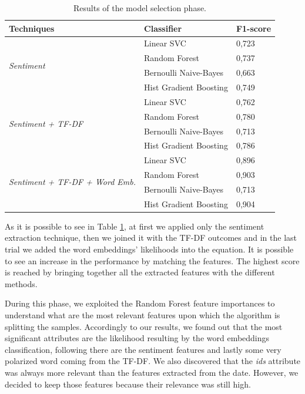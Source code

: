 \documentclass[conference]{IEEEtran}
\begin{document}
\begin{table}[h]
\begin{tabular}{@{}lll@{}}
\toprule
\textbf{Techniques}                                     & \textbf{Classifier}                       & \textbf{F1-score} \\ \midrule
\multirow{4}{*}{\textit{Sentiment}}                     & Linear SVC                       & 0,723    \\
                                               & Random Forest         & 0,737    \\
                                               & Bernoulli Naive-Bayes            & 0,663    \\
                                               & Hist Gradient Boosting & 0,749    \\ \midrule
\multirow{4}{*}{\textit{Sentiment + TF-DF}}             & Linear SVC                       & 0,762    \\
                                               & Random Forest         & 0,780    \\
                                               & Bernoulli Naive-Bayes            & 0,713    \\
                                               & Hist Gradient Boosting & 0,786    \\ \midrule
\multirow{4}{*}{\textit{Sentiment + TF-DF + Word Emb.}} & Linear SVC                       & 0,896    \\
                                               & Random Forest         & 0,903    \\
                                               & Bernoulli Naive-Bayes            & 0,713    \\
                                               & Hist Gradient Boosting & 0,904    \\ \bottomrule
\end{tabular}
\caption{Results of the model selection phase.}
\label{tab:techniques}
\end{table}
As it is possible to see in Table \ref{tab:techniques}, at first we applied only the sentiment extraction technique, then we joined it with the TF-DF outcomes and in the last trial we added the word embeddings' likelihoods into the equation. It is possible to see an increase in the performance by matching the features. The highest score is reached by bringing together all the extracted features with the different methods.

During this phase, we exploited the Random Forest feature importances to understand what are the most relevant features upon which the algorithm is splitting the samples. Accordingly to our results, we found out that the most significant attributes are the likelihood resulting by the word embeddings classification, following there are the sentiment features and lastly some very polarized word coming from the TF-DF. We also discovered that the \textit{ids} attribute was always more relevant than the features extracted from the date. However, we decided to keep those features because their relevance was still high.
\end{document}
